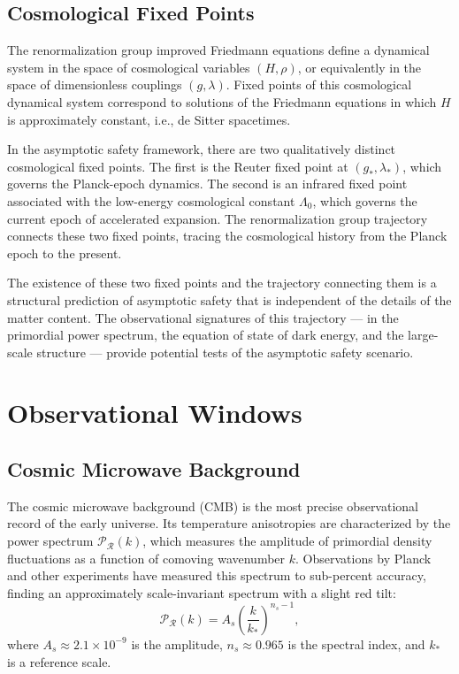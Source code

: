 \documentclass[11pt, twoside, openright]{book}
\theoremstyle{dotted}
\theoremstyle{definition}
\begin{document}
\section{Cosmological Fixed Points}

The renormalization group improved Friedmann equations define a dynamical system
in the space of cosmological variables $(H, \rho)$, or equivalently in the space
of dimensionless couplings $(g, \lambda)$. Fixed points of this cosmological
dynamical system correspond to solutions of the Friedmann equations in which $H$
is approximately constant, i.e., de Sitter spacetimes.

In the asymptotic safety framework, there are two qualitatively distinct cosmological
fixed points. The first is the Reuter fixed point at $(g_*, \lambda_*)$, which
governs the Planck-epoch dynamics. The second is an infrared fixed point associated
with the low-energy cosmological constant $\Lambda_0$, which governs the current
epoch of accelerated expansion. The renormalization group trajectory connects these
two fixed points, tracing the cosmological history from the Planck epoch to the
present.

The existence of these two fixed points and the trajectory connecting them is a
structural prediction of asymptotic safety that is independent of the details of
the matter content. The observational signatures of this trajectory --- in the
primordial power spectrum, the equation of state of dark energy, and the
large-scale structure --- provide potential tests of the asymptotic safety scenario.

\chapter{Observational Windows}
\label{ch:observations}

\section{Cosmic Microwave Background}

The cosmic microwave background (CMB) is the most precise observational record of
the early universe. Its temperature anisotropies are characterized by the power
spectrum $\mathcal{P}_{\mathcal{R}}(k)$, which measures the amplitude of primordial
density fluctuations as a function of comoving wavenumber $k$. Observations by
Planck and other experiments have measured this spectrum to sub-percent accuracy,
finding an approximately scale-invariant spectrum with a slight red tilt:
\begin{equation}
  \mathcal{P}_{\mathcal{R}}(k) = A_s\left(\frac{k}{k_*}\right)^{n_s - 1},
  \label{eq:power_spectrum}
\end{equation}
where $A_s \approx 2.1 \times 10^{-9}$ is the amplitude, $n_s \approx 0.965$ is
the spectral index, and $k_*$ is a reference scale.
\end{document}
